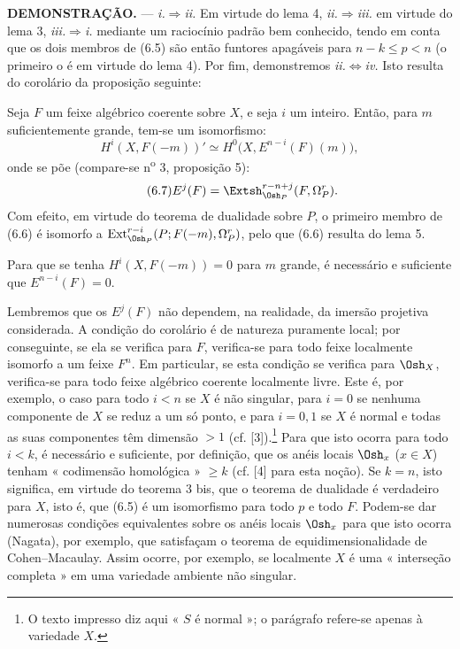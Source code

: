 \noindent\textbf{DEMONSTRAÇÃO.} --- \textit{i.}$\Rightarrow$\textit{ii.} Em
virtude do lema 4, \textit{ii.}$\Rightarrow$\textit{iii.} em virtude do lema 3,
\textit{iii.}$\Rightarrow$\textit{i.} mediante um raciocínio padrão bem conhecido,
tendo em conta que os dois membros de (6.5) são então funtores apagáveis
para $n-k\leq p<n$ (o primeiro o é em virtude do lema 4). Por fim, demonstremos
\textit{ii.}$\Leftrightarrow$\textit{iv.} Isto resulta do corolário da
proposição seguinte:

 Seja $F$ um feixe algébrico coerente sobre $X$, e
seja $i$ um inteiro. Então, para $m$ suficientemente grande, tem-se um isomorfismo:
\begin{equation}\tag{6.6}
  H^{i}(X,F(-m))'
  \simeq H^{0}\bigl(X,E^{n-i}(F)(m)\bigr),
\end{equation}
onde se põe (compare-se n\textsuperscript{o} 3, proposição 5):
\begin{equation}\tag{6.7}
  E^{j}(F)=\Extsh_{\Osh_P}^{r-n+j}(F,\Omega_P^{r}).
\end{equation}
Com efeito, em virtude do teorema de dualidade sobre $P$, o primeiro membro de (6.6)
é isomorfo a
$\operatorname{Ext}_{\Osh_P}^{r-i}(P;F(-m),\Omega_P^{r})$, pelo que (6.6) resulta
do lema 5.

 Para que se tenha $H^{i}(X,F(-m))=0$ para $m$ grande, é
necessário e suficiente que $E^{n-i}(F)=0$.

Lembremos que os $E^{j}(F)$ não dependem, na realidade, da imersão projetiva
considerada. A condição do corolário é de natureza puramente local; por conseguinte,
se ela se verifica para $F$, verifica-se para todo feixe localmente
isomorfo a um feixe $F^{n}$. Em particular, se esta condição se verifica
para $\Osh_X$, verifica-se para todo feixe algébrico coerente localmente
livre. Este é, por exemplo, o caso para todo $i<n$ se $X$ é não singular, para
$i=0$ se nenhuma componente de $X$ se reduz a um só ponto, e para $i=0,1$
se $X$ é normal e todas as suas componentes têm dimensão $>1$ (cf.
[3]).\footnote{O texto impresso diz aqui « $S$ é normal »; o parágrafo
refere-se apenas à variedade $X$.} Para que isto ocorra para todo
$i<k$, é necessário e suficiente, por definição, que os anéis locais
$\Osh_x$ ($x\in X$) tenham « codimensão homológica » $\geq k$ (cf. [4]
para esta noção). Se $k=n$, isto significa, em virtude do teorema 3 bis, que o
teorema de dualidade é verdadeiro para $X$, isto é, que (6.5) é um isomorfismo para
todo $p$ e todo $F$. Podem-se dar numerosas condições equivalentes sobre
os anéis locais $\Osh_x$ para que isto ocorra (Nagata), por exemplo, que
satisfaçam o teorema de equidimensionalidade de Cohen--Macaulay. Assim ocorre,
por exemplo, se localmente $X$ é uma « interseção completa » em uma
variedade ambiente não singular.

